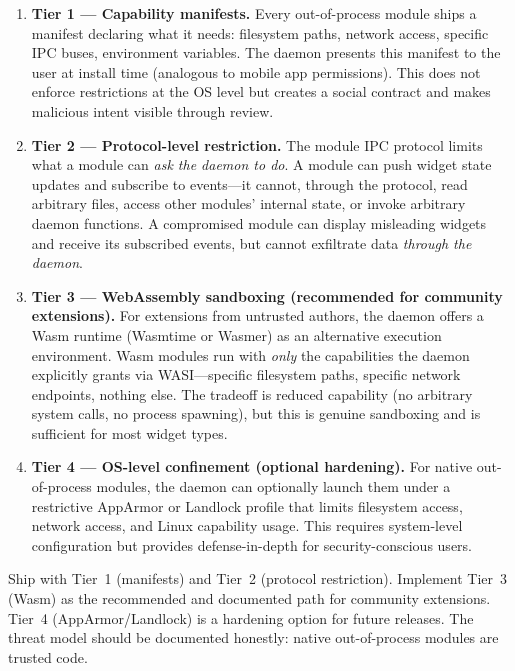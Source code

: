 \documentclass[11pt,a4paper]{article}
\begin{document}
\begin{enumerate}[leftmargin=1.5em, itemsep=4pt]
  \item \textbf{Tier 1 --- Capability manifests.} Every out-of-process module ships a manifest declaring what it needs: filesystem paths, network access, specific IPC buses, environment variables. The daemon presents this manifest to the user at install time (analogous to mobile app permissions). This does not enforce restrictions at the OS level but creates a social contract and makes malicious intent visible through review.

  \item \textbf{Tier 2 --- Protocol-level restriction.} The module IPC protocol limits what a module can \emph{ask the daemon to do}. A module can push widget state updates and subscribe to events---it cannot, through the protocol, read arbitrary files, access other modules' internal state, or invoke arbitrary daemon functions. A compromised module can display misleading widgets and receive its subscribed events, but cannot exfiltrate data \emph{through the daemon}.

  \item \textbf{Tier 3 --- WebAssembly sandboxing (recommended for community extensions).} For extensions from untrusted authors, the daemon offers a Wasm runtime (Wasmtime or Wasmer) as an alternative execution environment. Wasm modules run with \emph{only} the capabilities the daemon explicitly grants via WASI---specific filesystem paths, specific network endpoints, nothing else. The tradeoff is reduced capability (no arbitrary system calls, no process spawning), but this is genuine sandboxing and is sufficient for most widget types.

  \item \textbf{Tier 4 --- OS-level confinement (optional hardening).} For native out-of-process modules, the daemon can optionally launch them under a restrictive AppArmor or Landlock profile that limits filesystem access, network access, and Linux capability usage. This requires system-level configuration but provides defense-in-depth for security-conscious users.
\end{enumerate}

\begin{notebox}[v1 Recommendation]
Ship with Tier~1 (manifests) and Tier~2 (protocol restriction). Implement Tier~3 (Wasm) as the recommended and documented path for community extensions. Tier~4 (AppArmor/Landlock) is a hardening option for future releases. The threat model should be documented honestly: native out-of-process modules are trusted code.
\end{notebox}
\end{document}
